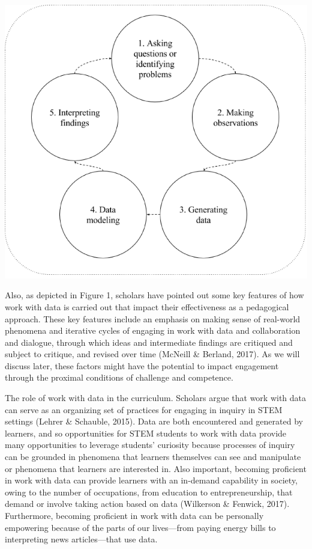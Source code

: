 \documentclass[]{msu-thesis}
\theoremstyle{definition}
\theoremstyle{definition}
\theoremstyle{definition}
\theoremstyle{remark}
\begin{document}
\begin{center}\includegraphics[width=0.8\linewidth]{images/figure1} \end{center}

Also, as depicted in Figure 1, scholars have pointed out some key
features of how work with data is carried out that impact their
effectiveness as a pedagogical approach. These key features include an
emphasis on making sense of real-world phenomena and iterative cycles of
engaging in work with data and collaboration and dialogue, through which
ideas and intermediate findings are critiqued and subject to critique,
and revised over time (McNeill \& Berland, 2017). As we will discuss
later, these factors might have the potential to impact engagement
through the proximal conditions of challenge and competence.

The role of work with data in the curriculum. Scholars argue that work
with data can serve as an organizing set of practices for engaging in
inquiry in STEM settings (Lehrer \& Schauble, 2015). Data are both
encountered and generated by learners, and so opportunities for STEM
students to work with data provide many opportunities to leverage
students' curiosity because processes of inquiry can be grounded in
phenomena that learners themselves can see and manipulate or phenomena
that learners are interested in. Also important, becoming proficient in
work with data can provide learners with an in-demand capability in
society, owing to the number of occupations, from education to
entrepreneurship, that demand or involve taking action based on data
(Wilkerson \& Fenwick, 2017). Furthermore, becoming proficient in work
with data can be personally empowering because of the parts of our
lives---from paying energy bills to interpreting news articles---that
use data.
\end{document}
